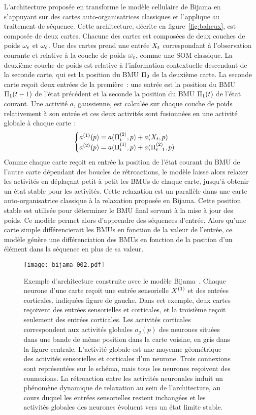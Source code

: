 \documentclass[../main]{subfiles}
\begin{document}
L'architecture proposée en \cite{baheux_towards_2014} transforme le modèle cellulaire de Bijama en s'appuyant sur des cartes auto-organisatrices classiques et l'applique au traitement de séquence. Cette architecture, décrite en figure~\ref{fig:baheux}, est composée de deux cartes. 
Chacune des cartes est composées de deux couches de poids $\omega_e$ et $\omega_c$. Une des cartes prend une entrée $X_t$ correspondant à l'observation courante et relative à la couche de poids $\omega_e$, comme une SOM classique. 
La deuxième couche de poids est relative à l'information contextuelle descendant de la seconde carte, qui est la position du BMU $\Pi_2$ de la deuxième carte. 
La seconde carte reçoit deux entrées de la première~: une entrée est la position du BMU $\Pi_1(t-1)$ de l'état précédent et la seconde la position du BMU $\Pi_1(t)$ de l'état courant. 
Une activité $a$, gaussienne, est calculée sur chaque couche de poids relativement à son entrée et ces deux activités sont fusionnées en une activité globale à chaque carte :
$$
\begin{cases}
    a^{({1})}(p) = a(\Pi^{({2})}_t,p) + a(X_t,p)\\
    a^{({2})}(p) = a(\Pi^{({1})}_t,p) + a(\Pi^{({2})}_{t-1},p)
\end{cases}
$$
Comme chaque carte reçoit en entrée la position de l'état courant du BMU de l'autre carte dépendant des boucles de rétroactions, le modèle laisse alors relaxer les activités en déplaçant petit à petit les BMUs de chaque carte, jusqu'à obtenir un état stable pour les activités. Cette relaxation est un parallèle dans une carte auto-organisatrice classique à la relaxation proposée en Bijama.
Cette position stable est utilisée pour déterminer le BMU final servant à la mise à jour des poids.
Ce modèle permet alors d'apprendre des séquences d'entrée. Alors qu'une carte simple différencierait les BMUs en fonction de la valeur de l'entrée, ce modèle génère une différenciation des BMUs en fonction de la position d'un élément dans la séquence en plus de sa valeur. 


\begin{figure}
    \centering
    \texttt{[image: bijama\_002.pdf]}
    \caption{Exemple d'architecture construite avec le modèle Bijama~\cite{menard05}.
    Chaque neurone d'une carte reçoit une entrée sensorielle $X^{({1})}$ et des entrées corticales, indiquées figure de gauche.
    Dans cet exemple, deux cartes reçoivent des entrées sensorielles et corticales, et la troisième reçoit seulement des entrées corticales.
    Les activités corticales correspondent aux activités globales $a_g(p)$ des neurones situées dans une bande de même position dans la carte voisine, en gris dans la figure centrale. L'activité globale est une moyenne géométrique des activités sensorielles et corticales d'un neurone.
    Trois connexions sont représentées sur le schéma, mais tous les neurones reçoivent des connexions.
    La rétroaction entre les activités neuronales induit un phénomène dynamique de relaxation au sein de l'architecture, au cours duquel les entrées sensorielles restent inchangées et les activités globales des neurones évoluent vers un état limite stable. \label{fig:bijama}}
\end{figure}
\end{document}
